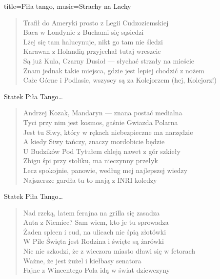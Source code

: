 \begin{song}{title={Piła tango}, music={Strachy na Lachy}}
\begin{verse}
        Trafił do Ameryki prosto z Legii Cudzoziemskiej \\
        Baca w Londynie z Buchami się sąsiedzi \\
        Lżej się tam halucynuje, nikt go tam nie śledzi \\
        Karawan z Holandią przyjechał tutaj wreszcie \\
        Są już Kula, Czarny Dusioł --- słychać strzały na mieście \\
        Znam jednak takie miejsca, gdzie jest lepiej chodzić z nożem \\
        Całe Górne i Podlasie, wszyscy są za Kolejorzem (hej, Kolejorz!)
    \end{verse}
    \begin{chorus}
        Statek Piła Tango\ldots
    \end{chorus}
    \begin{verse}
        Andrzej Kozak, Mandaryn --- znana postać medialna \\
        Tyci przy nim jest kosmos, gaśnie Gwiazda Polarna \\
        Jest tu Siwy, który w rękach niebezpieczne ma narzędzie \\
        A kiedy Siwy tańczy, znaczy mordobicie będzie \\
        U Budzików Pod Tytułem chleją nawet z gór szkieły \\
        Zbigu śpi przy stoliku, ma nieczynny przełyk \\
        Lecz spokojnie, panowie, według mej najlepszej wiedzy \\
        Najszersze gardła tu to mają z INRI koledzy
    \end{verse}
    \begin{chorus}
        Statek Piła Tango\ldots
    \end{chorus}
    \begin{verse}
        Nad rzeką, latem ferajna na grilla się zasadza \\
        Auta z Niemiec? Sam wiem, kto je tu sprowadza \\
        Żaden spleen i cud, na ulicach nie śpią złotówki \\
        W Pile Święta jest Rodzina i święte są żarówki \\
        Nic nie szkodzi, że z wieczora miasto dławi się w fetorach \\
        Ważne, że jest żużel i kiełbasy senatora \\
        Fajne z Wincentego Pola idą w świat dziewczyny \\

\end{verse}
\end{song}
